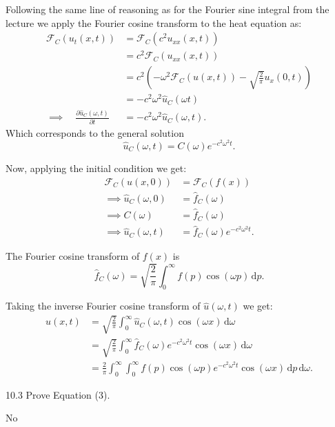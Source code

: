 \begin{derivation}
  Following the same line of reasoning as for the Fourier sine integral from the lecture we apply the Fourier cosine transform to the heat equation as:
  \begin{align*}
    \mathcal{F}_C (u_t(x,t)) &= \mathcal{F}_C \left( c^2 u_{x x} (x,t) \right) \\
                             &= c^2 \mathcal{F}_C \left( u_{x x} (x,t) \right) \\
                             &= c^2 \left( - \omega^2 \mathcal{F}_C \left( u(x,t) \right) - \sqrt{\frac{2}{\pi}} u_x (0,t) \right) \\
                             &= - c^2 \omega^2 \hat{u}_C (\omega t) \\
    \implies \quad \frac{\partial \hat{u}_C(\omega,t)}{\partial t} &= - c^2 \omega^2 \hat{u}_C(\omega, t)
  .\end{align*}
  Which corresponds to the general solution
  \begin{equation*}
    \hat{u}_C(\omega,t) = C(\omega) e^{-c^2 \omega^2 t}
  .\end{equation*}
  
  Now, applying the initial condition we get:
  \begin{align*}
    \mathcal{F}_C(u(x,0)) &= \mathcal{F}_C (f(x)) \\
    \implies \hat{u}_C (\omega, 0) &= \hat{f}_C (\omega) \\
    \implies C(\omega) &= \hat{f}_C(\omega) \\
    \implies \hat{u}_C(\omega, t) &= \hat{f}_C(\omega) e^{-c^2 \omega^2 t}
  .\end{align*}

  The Fourier cosine transform of $f(x)$ is
  \begin{equation*}
    \hat{f}_C(\omega) = \sqrt{\frac{2}{\pi}} \int_{0}^{\infty} f(p) \cos (\omega p) \, \mathrm{d}p
  .\end{equation*}

  Taking the inverse Fourier cosine transform of $\hat{u}(\omega,t)$ we get:
  \begin{align*}
    u(x,t) &= \sqrt{\frac{2}{\pi}} \int_{0}^{\infty} \hat{u}_C (\omega, t) \cos (\omega x) \, \mathrm{d}\omega \\
          &= \sqrt{\frac{2}{\pi}} \int_{0}^{\infty} \hat{f}_C(\omega) e^{-c^2 \omega^2 t} \cos \left( \omega x \right) \, \mathrm{d}\omega \\
          &= \frac{2}{\pi} \int_{0}^{\infty} \int_{0}^{\infty} f(p) \cos (\omega p) e^{-c^2 \omega^2 t} \cos (\omega x) \, \mathrm{d}p \, \mathrm{d}\omega
  .\end{align*}
\end{derivation}


\begin{problem}{10.3}
  Prove Equation (3).
\end{problem}

\begin{derivation}
  No
\end{derivation}
